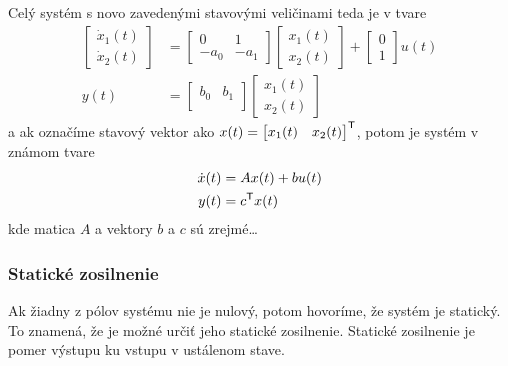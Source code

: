\documentclass[a4paper, 10pt, ]{article}
\begin{document}
Celý systém s novo zavedenými stavovými veličinami teda je v tvare
\begin{align}
	\begin{bmatrix}
    	  \dot x_1(t) \\
		  \dot x_2(t)
 	\end{bmatrix}
	&=
	\begin{bmatrix}
    	0 & 1 \\
    	- a_0 & - a_1
  	\end{bmatrix}
    \begin{bmatrix}
    	  x_1(t) \\
		  x_2(t)
 	\end{bmatrix}
    +
    \begin{bmatrix}
    	  0 \\
		  1
 	\end{bmatrix}
    u(t)
    \\
    y(t)
    &=
    \begin{bmatrix}
        b_0 & b_1 \\
    \end{bmatrix}
    \begin{bmatrix}
          x_1(t) \\
          x_2(t)
    \end{bmatrix}
\end{align}
a ak označíme stavový vektor ako $x(t) = \begin{bmatrix} x_1(t) & x_2(t) \end{bmatrix}^{\mathsf{T}}$, potom je systém v známom tvare
\begin{subequations} \label{susDifRovnicPreODE}
    \begin{align}
    	\dot x(t) &= A x(t) + b u(t) \\
        y(t) &= c^{\mathsf{T}} x(t)
    \end{align}
\end{subequations}
kde matica $A$ a vektory $b$ a $c$ sú zrejmé\ldots




\subsubsection{Statické zosilnenie}

Ak žiadny z pólov systému nie je nulový, potom hovoríme, že systém je statický. To znamená, že je možné určiť jeho statické zosilnenie. Statické zosilnenie je pomer výstupu ku vstupu v ustálenom stave.
\end{document}
